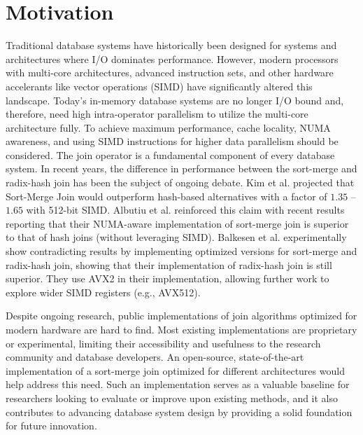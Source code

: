 \section{Motivation}
\label{sec:motivation}

Traditional database systems have historically been designed for systems and architectures where
I/O dominates performance. However, modern processors with multi-core architectures, advanced 
instruction sets, and other hardware accelerants like vector operations (SIMD) have significantly 
altered this landscape. Today's in-memory database systems are no longer I/O bound and, therefore,
need high intra-operator parallelism to utilize the multi-core architecture fully. To achieve
maximum performance, cache locality, NUMA awareness, and using SIMD instructions for higher data
parallelism should be considered.
The join operator is a fundamental component of every database system.
In recent years, the difference in performance between the sort-merge and radix-hash join has been
the subject of ongoing debate. Kim et al. \cite{10.14778/1687553.1687564} projected that Sort-Merge Join would outperform hash-based
alternatives with a factor of $1.35$ – $1.65$ with 512-bit SIMD. Albutiu et al. \cite{MPSM} reinforced this claim with recent results reporting that
their NUMA-aware implementation of sort-merge join is superior to that of hash joins (without
leveraging SIMD). Balkesen et al. \cite{Balkesen} experimentally show contradicting results by implementing 
optimized versions for sort-merge and radix-hash join, showing that their implementation of
radix-hash join is still superior. They use AVX2 in their implementation, allowing further
work to explore wider SIMD registers (e.g., AVX512).

Despite ongoing research, public implementations of join algorithms optimized for modern hardware
are hard to find. Most existing implementations are proprietary or experimental, limiting their
accessibility and usefulness to the research community and database developers. An open-source,
state-of-the-art implementation of a sort-merge join optimized for different architectures would
help address this need. Such an implementation serves as a valuable baseline for researchers
looking to evaluate or improve upon existing methods, and it also contributes to advancing database
system design by providing a solid foundation for future innovation.



